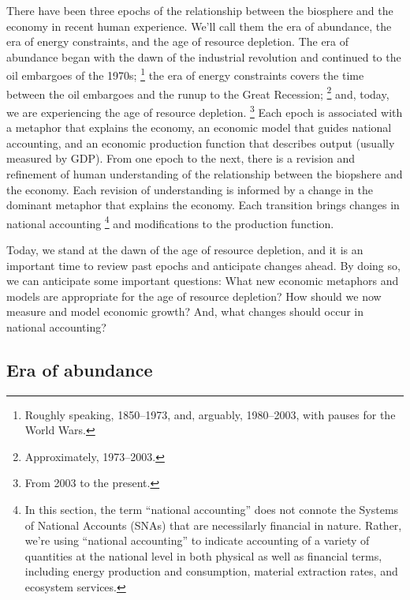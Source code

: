 There have been three epochs 
of the relationship between the biosphere and the economy
in recent human experience.
We'll call them 
the era of abundance, 
the era of energy constraints, and 
the age of resource depletion.
The era of abundance began 
with the dawn of the industrial revolution
and continued to the oil embargoes of the 1970s;%
	\footnote{
	Roughly speaking, 1850--1973, and, arguably, 1980--2003,
	with pauses for the World Wars.
	}
the era of energy constraints covers
the time between the oil embargoes and 
the runup to the Great Recession;%
	\footnote{
	Approximately, 1973--2003.
	}
and, today, we are experiencing the age of resource depletion.%
	\footnote{
	From 2003 to the present.
	}
Each epoch is associated with 
a metaphor that explains the economy,
an economic model that guides national accounting, and
an economic production function that describes output 
(usually measured by GDP).
From one epoch to the next, there is a revision and refinement of 
human understanding of the relationship between the biopshere and the economy.
Each revision of understanding is informed by a change in the dominant metaphor
that explains the economy.
Each transition brings changes in national accounting%
	\footnote{
	In this section, 
	the term ``national accounting'' does not connote the
	Systems of National Accounts (SNAs) that are necessilarly financial in nature.
	Rather, we're using ``national accounting'' to indicate
	accounting of a variety of quantities at the national level
	in both physical as well as financial terms, 
	including energy production and consumption, 
	material extraction rates,
	and ecosystem services.
	}
and modifications to the production function.

Today, we stand at the dawn of the age of resource depletion, 
and it is an important time to review past epochs
and anticipate changes ahead.
By doing so, we can anticipate some important questions:
What new economic metaphors and models are appropriate for the age of resource depletion?
How should we now measure and model economic growth?
And, what changes should occur in national accounting?


\subsection{Era of abundance}
\label{sec:era_of_abundance}

